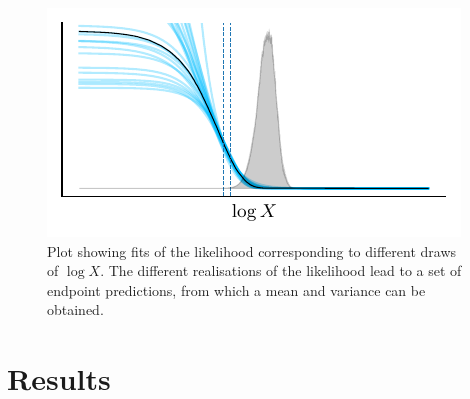\documentclass[usenatbib]{mnras}
\begin{document}
\begin{figure}
\begin{center}
	\includegraphics{Figures/gauss_overfit.pdf}
\end{center}
\caption{Plot showing fits of the likelihood corresponding to different draws of $\log X$. The different realisations of the likelihood lead to a set of endpoint predictions, from which a mean and variance can be obtained.}
\label{fig:gauss_overfit}
\end{figure}




\section{Results}\label{sec:Results}
\end{document}
